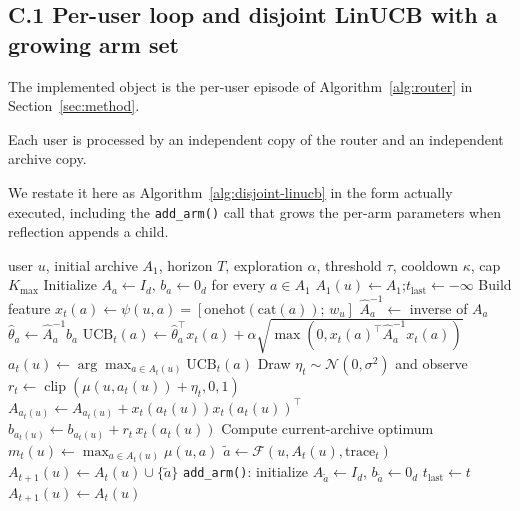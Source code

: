 \documentclass{article} %
\begin{document}
\subsection{C.1 Per-user loop and disjoint LinUCB with a growing arm set}

\label{app:impl-loop}

The implemented object is the per-user episode of Algorithm~\ref{alg:router} in Section~\ref{sec:method}.

Each user is processed by an independent copy of the router and an independent archive copy.

We restate it here as Algorithm~\ref{alg:disjoint-linucb} in the form actually executed, including the \texttt{add\_arm()} call that grows the per-arm parameters when reflection appends a child.

\begin{algorithm}[h]
\caption{Disjoint LinUCB with growing arm set (per-user)}
\label{alg:disjoint-linucb}
\begin{algorithmic}[1]
\Require user $u$, initial archive $A_1$, horizon $T$, exploration $\alpha$, threshold $\tau$, cooldown $\kappa$, cap $K_{\max}$
\State Initialize $A_a \gets I_d$, $b_a \gets 0_d$ for every $a \in A_1$
\State $A_1(u) \gets A_1$;\quad $t_{\text{last}} \gets -\infty$
        \State Build feature $x_t(a) \gets \psi(u, a) = [\mathrm{onehot}(\mathrm{cat}(a));\, w_u]$
        \State $\widehat{A}_a^{-1} \gets$ inverse of $A_a$
        \State $\hat\theta_a \gets \widehat{A}_a^{-1} b_a$
        \State $\mathrm{UCB}_t(a) \gets \hat\theta_a^\top x_t(a) + \alpha \sqrt{\max(0, x_t(a)^\top \widehat{A}_a^{-1} x_t(a))}$
    \EndFor
    \State $a_t(u) \gets \arg\max_{a \in A_t(u)} \mathrm{UCB}_t(a)$
    \State Draw \(\eta_t\sim\mathcal N(0,\sigma^2)\) and observe
    \(r_t\gets\operatorname{clip}(\mu(u,a_t(u))+\eta_t,0,1)\)
    \State $A_{a_t(u)} \gets A_{a_t(u)} + x_t(a_t(u)) x_t(a_t(u))^\top$
    \State $b_{a_t(u)} \gets b_{a_t(u)} + r_t \, x_t(a_t(u))$
    \State Compute current-archive optimum $m_t(u) \gets \max_{a \in A_t(u)} \mu(u, a)$
        \State $\tilde a \gets \mathcal{F}(u, A_t(u), \text{trace}_t)$ 
        \State $A_{t+1}(u) \gets A_t(u) \cup \{\tilde a\}$
        \State \texttt{add\_arm()}: initialize $A_{\tilde a} \gets I_d$, $b_{\tilde a} \gets 0_d$
        \State $t_{\text{last}} \gets t$
    \Else
        \State $A_{t+1}(u) \gets A_t(u)$
    \EndIf
\EndFor
\end{algorithmic}
\end{algorithm}
\end{document}
